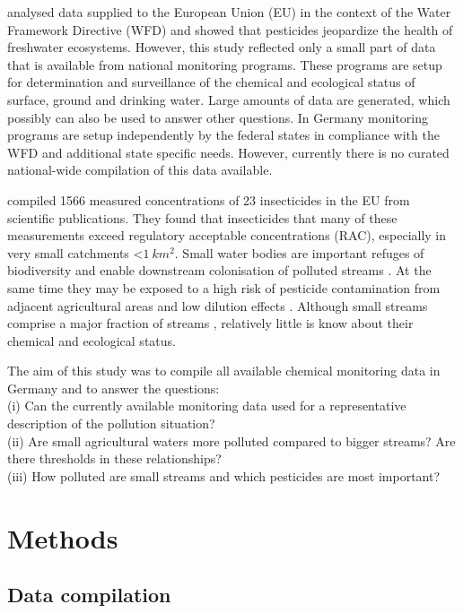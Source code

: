 \documentclass[journal=esthag,manuscript=article]{achemso}
\begin{document}
\citet{malaj_organic_2014} analysed data supplied to the European Union (EU) in the context of the Water Framework Directive (WFD) and showed that pesticides jeopardize the health of freshwater ecosystems.
However, this study reflected only a small part of data that is available from national monitoring programs.
These programs are setup for determination and surveillance of the chemical and ecological status of surface, ground and drinking water.
Large amounts of data are generated, which possibly can also be used to answer other questions.
In Germany monitoring programs are setup independently by the federal states in compliance with the WFD \citep{quevauviller_water_2008} and additional state specific needs.
However, currently there is no curated national-wide compilation of this data available.

\citet{stehle_pesticide_2015} compiled 1566 measured concentrations of 23 insecticides in the EU from scientific publications. 
They found that insecticides that many of these measurements exceed regulatory acceptable concentrations (RAC), especially in very small catchments \textless $1~km^2$.
Small water bodies are important refuges of biodiversity \citep{davies_comparison_2008} and enable downstream colonisation of polluted streams \citep{liess_analyzing_2005}.
At the same time they may be exposed to a high risk of pesticide contamination from adjacent agricultural areas and low dilution effects \citep{liess_determination_1999}.
Although small streams comprise a major fraction of streams \citep{nadeau_hydrological_2007}, relatively little is know about their chemical and ecological status.

The aim of this study was to compile all available chemical monitoring data in Germany and to answer the questions: \\
(i) Can the currently available monitoring data used for a representative description of the pollution situation? \\
(ii) Are small agricultural waters more polluted compared to bigger streams? Are there thresholds in these relationships? \\
(iii) How polluted are small streams and which pesticides are most important?


\section{Methods}
\subsection{Data compilation}
\end{document}
